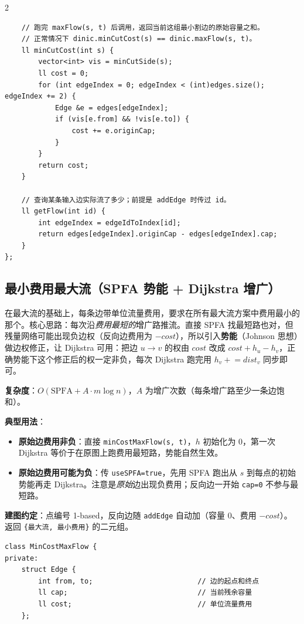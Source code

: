 \begin{multicols*}{2}
\begin{verbatim}
    // 跑完 maxFlow(s, t) 后调用，返回当前这组最小割边的原始容量之和。
    // 正常情况下 dinic.minCutCost(s) == dinic.maxFlow(s, t)。
    ll minCutCost(int s) {
        vector<int> vis = minCutSide(s);
        ll cost = 0;
        for (int edgeIndex = 0; edgeIndex < (int)edges.size(); edgeIndex += 2) {
            Edge &e = edges[edgeIndex];
            if (vis[e.from] && !vis[e.to]) {
                cost += e.originCap;
            }
        }
        return cost;
    }

    // 查询某条输入边实际流了多少；前提是 addEdge 时传过 id。
    ll getFlow(int id) {
        int edgeIndex = edgeIdToIndex[id];
        return edges[edgeIndex].originCap - edges[edgeIndex].cap;
    }
};
		\end{verbatim}


		\subsection{最小费用最大流（SPFA 势能 + Dijkstra 增广）}

		在最大流的基础上，每条边带单位流量费用，要求在所有最大流方案中费用最小的那个。核心思路：每次沿\emph{费用最短的}增广路推流。直接 SPFA 找最短路也对，但残量网络可能出现负边权（反向边费用为 $-cost$），所以引入\textbf{势能}（Johnson 思想）做边权修正，让 Dijkstra 可用：把边 $u\to v$ 的权由 $cost$ 改成 $cost + h_u - h_v$，正确势能下这个修正后的权一定非负，每次 Dijkstra 跑完用 $h_v \mathrel{+}= dist_v$ 同步即可。

		\textbf{复杂度}：$O(\text{SPFA} + A \cdot m \log n)$，$A$ 为增广次数（每条增广路至少一条边饱和）。

		\textbf{典型用法}：

		\begin{itemize}
			\item \textbf{原始边费用非负}：直接 \texttt{minCostMaxFlow(s, t)}，$h$ 初始化为 $0$，第一次 Dijkstra 等价于在原图上跑费用最短路，势能自然生效。
			\item \textbf{原始边费用可能为负}：传 \texttt{useSPFA=true}，先用 SPFA 跑出从 $s$ 到每点的初始势能再走 Dijkstra。注意是\emph{原始}边出现负费用；反向边一开始 \texttt{cap=0} 不参与最短路。
		\end{itemize}

		\textbf{建图约定}：点编号 1-based，反向边随 \texttt{addEdge} 自动加（容量 $0$、费用 $-cost$）。返回 \texttt{\{最大流, 最小费用\}} 的二元组。

		\begin{verbatim}
class MinCostMaxFlow {
private:
    struct Edge {
        int from, to;                         // 边的起点和终点
        ll cap;                               // 当前残余容量
        ll cost;                              // 单位流量费用
    };


\end{verbatim}
\end{multicols*}
